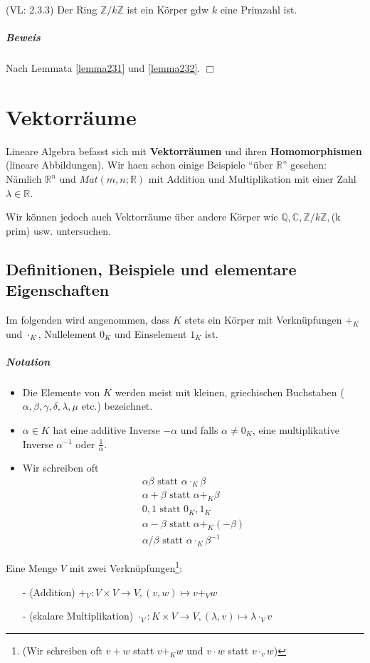 \documentclass[11pt]{report}
\newcommand*\Zb[1] {\mathbb{#1}}
\newcommand*\f[1] {\textbf{#1}}
\begin{document}
\begin{korollar} (VL: 2.3.3)
 \label{korollar233}
Der Ring $\Zb{Z}/k\Zb{Z}$ ist ein Körper gdw $k$ eine Primzahl ist. 
\end{korollar}
\paragraph{Beweis}
Nach Lemmata \ref{lemma231} und \ref{lemma232}. \hfill $\Box$

\chapter{Vektorräume}
Lineare Algebra befasst sich mit \f{Vektorräumen} und ihren \f{Homomorphismen} (lineare Abbildungen). Wir haen schon einige Beispiele ``über $\Zb{R}$'' gesehen: Nämlich $\Zb{R}^{n}$ und $Mat(m,n;\Zb{R})$ mit Addition und Multiplikation mit einer Zahl $\lambda \in \Zb{R}$.

Wir können jedoch auch Vektorräume über andere Körper wie $\Zb{Q}, \Zb{C}, \Zb{Z}/k\Zb{Z},$(k prim) usw. untersuchen.

\section{Definitionen, Beispiele und elementare Eigenschaften}
Im folgenden wird angenommen, dass $K$ stets ein Körper mit Verknüpfungen $+_K$ und $\cdot_K$, Nullelement $0_K$ und Einselement $1_K$ ist.
\paragraph{Notation}
\begin{itemize}
 \item Die Elemente von $K$ werden meist mit kleinen, griechischen Buchstaben ($\alpha, \beta, \gamma, \delta, \lambda, \mu$ etc.) bezeichnet.
 \item $\alpha \in K$ hat eine additive Inverse $-\alpha$ und falls $\alpha\neq 0_K$, eine multiplikative Inverse $\alpha^{-1}$ oder $\frac{1}{\alpha}$.
 \item Wir schreiben oft 
\begin{align}
\alpha\beta\textrm{ statt }\alpha\cdot_K\beta \\
\alpha+\beta\textrm{ statt }\alpha+_K\beta \\
0, 1 \text{ statt } 0_K, 1_K \\
\alpha-\beta\textrm{ statt }\alpha+_K(-\beta) \\
\alpha/\beta\textrm{ statt }\alpha\cdot_K\beta^{-1}
\end{align}
\end{itemize}
Eine Menge $V$ mit zwei Verknüpfungen\footnote{(Wir schreiben oft $v+w$ statt $v+_K w$ und $v\cdot w$ statt $v\cdot_v w$)}:
\begin{itemize}
 \item[-] (Addition) $+_V: V\times V \rightarrow V, (v,w) \mapsto v+_V w$
 \item[-] (skalare Multiplikation) $\cdot_V: K\times V \rightarrow V, (\lambda,v) \mapsto \lambda\cdot_V v$
\end{itemize}
\end{document}
